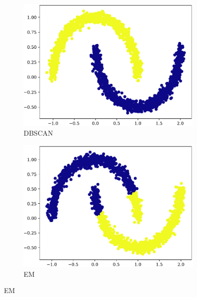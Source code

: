 \begin{figure}[t!]
    \begin{subfigure}[b]{0.45\textwidth}
        \includegraphics[width=\textwidth]{../plots/moons_dbscan.pdf}
        \caption{DBSCAN}
        \label{subfig:moon-dbscan}
    \end{subfigure}
    \hspace{0.09\textwidth}
    \begin{subfigure}[b]{0.45\textwidth}
        \includegraphics[width=\textwidth]{../plots/moons_em.pdf}
        \caption{EM}
        \label{subfig:moon-em}
    \end{subfigure}
\end{figure}
